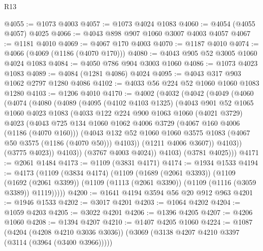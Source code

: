 \begin{lexlean}{R13}
\begin{coremodule}
@4055 := @1073 @4003
@4057 := @1073 @4024 @1083
@4060 := @4054 (@4055 @4057) @4025
@4066 := @4043 @898 @907 @1060 @3007 @4003 @4057
@4067 := @1181 @4010
@4069 := @4067 @170 @4003
@4070 := @1187 @4010
@4074 := @4066 (@4069 (@1186 (@4070 @170)))
@4080 := @4043 @905 @52 @3005 @1060 @4024 @1083
@4084 := @4050 @786 @904 @3003 @1060
@4086 := @1073 @4023 @1083
@4089 := @4084 (@1281 @4086) @4024
@4095 := @4043 @317 @903 @1062 @2797 @1280 @4086
@4102 := @4033 @56 @224 @52 @1060 @1060 @1083 @1280
@4103 := @1206 @4010
@4170 := @4002
    (@4032
      (@4042
        (@4049
          (@4060
            (@4074
              (@4080
                (@4089
                  (@4095
                    (@4102 @4103 @1325)
                    (@4043
                      @901
                      @52
                      @1065
                      @1060
                      @4023
                      @1083
                      (@4033
                        @122
                        @224
                        @900
                        @1063
                        @1060
                        (@4021 @3729)
                        @4023
                        (@4043
                          @725
                          @134
                          @1060
                          @1062
                          @4006
                          @3729
                          (@4067 @160 @4006 (@1186 (@4070 @160)))
                          (@4043
                            @132
                            @52
                            @1060
                            @1060
                            @3575
                            @1083
                            (@4067 @50 @3575 (@1186 (@4070 @50)))
                            @4103))
                        (@1211 @4006 @3607))
                      @4103))
                  (@3775 @4023))
                @4103))
            (@3767 @4003 @4024))
          @4103)
        (@3781 @4025)))
@4171 := @2061 @1484
@4173 := @1109 (@3831 @4171)
@4174 := @1934 @1533
@4194 := @4173
    (@1109
      (@3834 @4174)
      (@1109
        (@1689 (@2061 @3393))
        (@1109
          (@1692 (@2061 @3399))
          (@1109 (@1113 (@2061 @3390)) (@1109 (@1116 (@3059 @3389)) @1119)))))
@4200 := @1641 @4194 @3594 @56 @20 @912 @963
@4201 := @1946 @1533
@4202 := @3017 @4201
@4203 := @1064 @4202
@4204 := @1059 @4203
@4205 := @3022 @4201
@4206 := @1396 @4205
@4207 := @4206 @1060
@4208 := @1394 @4207
@4210 := @1407 @4205 @1060
@4224 := @1087
    (@4204 (@4208 @4210 @3036 @3036))
    (@3069 (@3138 @4207 @4210 @3397 (@3114 (@3964 (@3400 @3966)))))

\end{coremodule}
\end{lexlean}
